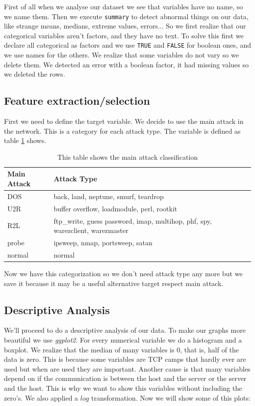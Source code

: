\documentclass[a4paper]{article} %
\begin{document}
First of all when we analyse our dataset we see that variables have no name, so we name them. Then we execute \lstinline|summary| to detect abnormal things on our data, like strange means, medians, extreme values, errors... So we first realize that our categorical variables aren't factors, and they have no text. To solve this first we declare all categorical as factors and we use \lstinline|TRUE| and \lstinline|FALSE| for boolean ones, and we use names for the others. We realize that some variables do not vary so we delete them. We detected an error with a boolean factor, it had missing values so we deleted the rows.


\subsection{Feature extraction/selection}
First we need to define the target variable. We decide to use the main attack in the network. This is a category for each attack type. The variable is defined as table \ref{table:main} shows. 
\begin{table}
	\begin{tabular}{ll}
		Main Attack & Attack Type                                                            \\ \hline
		DOS         & back, land, neptune, smurf, teardrop                                       \\
		U2R         & buffer overflow, loadmodule, perl, rootkit                               \\
		R2L         & ftp\_write, guess password, imap, multihop, phf, spy, warezclient, warezmaster \\
		probe       & ipsweep, nmap, portsweep, satan                                           \\
		normal      & normal                                                                 \\
	\end{tabular}
	\caption{This table shows the main attack classification}
	\label{table:main}
	
\end{table}
Now we have this categorization so we don't need attack type any more but we save it because it may be a useful alternative target respect main attack. 


\subsection{Descriptive Analysis}
We'll proceed to do a descriptive analysis of our data. To make our graphs more beautiful we use \textit{ggplot2}\cite{ggplot}. For every numerical variable we do a histogram and a boxplot. We realize that the median of many variables is 0, that is, half of the data is zero. This is because some variables are TCP camps that hardly ever are used but when are used they are important. Another cause is that many variables depend on if the communication is between the host and the server or the server and the host. This is why we want to show this variables without including the zero's. We also applied a $log$ transformation. Now we will show some of this plots:\\
\end{document}
